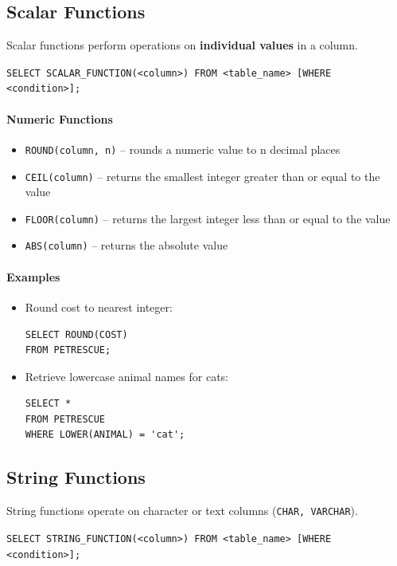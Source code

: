 \documentclass{article}
\begin{document}
\subsection{Scalar Functions}
Scalar functions perform operations on \textbf{individual values} in a column.  

\begin{FormulaBox}
\texttt{SELECT SCALAR\_FUNCTION(<column>) FROM <table\_name> [WHERE <condition>];}
\end{FormulaBox}
\paragraph{Numeric Functions}
\begin{itemize}
    \item \texttt{ROUND(column, n)} – rounds a numeric value to n decimal places  
    \item \texttt{CEIL(column)} – returns the smallest integer greater than or equal to the value  
    \item \texttt{FLOOR(column)} – returns the largest integer less than or equal to the value  
    \item \texttt{ABS(column)} – returns the absolute value  
\end{itemize}
\paragraph{Examples}
\begin{itemize}
    \item Round cost to nearest integer:
\begin{verbatim}
SELECT ROUND(COST)
FROM PETRESCUE;
\end{verbatim}

    \item Retrieve lowercase animal names for cats:
\begin{verbatim}
SELECT *
FROM PETRESCUE
WHERE LOWER(ANIMAL) = 'cat';
\end{verbatim}
\end{itemize}

\subsection{String Functions}
String functions operate on character or text columns (\texttt{CHAR, VARCHAR}).  

\begin{FormulaBox}
\texttt{SELECT STRING\_FUNCTION(<column>) FROM <table\_name> [WHERE <condition>];}
\end{FormulaBox}
\end{document}
